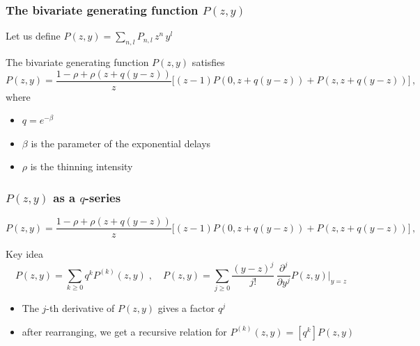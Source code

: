 \documentclass[table,aspectratio=169]{beamer}
\begin{document}
\begin{frame}[t]\frametitle{The bivariate generating function $P(z,y)$}
    Let us define $P(z,y) = \sum_{n,l} P_{n,l}\, z^n\,y^l$
    \begin{theorem}[Lancia et al, 2017]
        The bivariate generating function $P(z,y)$ satisfies
        \begin{equation*}
            P(z,y)= \frac{1 - \rho + \rho(z+q(y-z))}{z}\Big[ (z-1)P(0,z+q(y-z))
            + P(z, z+q(y-z))\Big]\,,
        \end{equation*}
        where
        \begin{itemize}
            \item $q=e^{-\beta}$
            \item $\beta$ is the parameter of the exponential delays
            \item $\rho$ is the thinning intensity
        \end{itemize}
    \end{theorem}
\end{frame}

\begin{frame}[t]\frametitle{$P(z,y)$ as a $q$-series}
    \begin{equation*}
        P(z,y)= \frac{1 - \rho + \rho(z+q(y-z))}{z}\Big[ (z-1)P(0,z+q(y-z))
        + P(z, z+q(y-z))\Big]\,,
    \end{equation*}
    \begin{alertblock}{Key idea}
        \begin{equation*}
            P(z,y)= \sum_{k\geq0} q^k P^{(k)}(z,y)\;,\quad
            P(z,y)= \sum_{j\geq0} \frac{(y-z)^j}{j!} \, \frac{\partial^j}{\partial y^j} P(z,y)\Big\vert_{y=z}
        \end{equation*}
        \begin{itemize}
            \item The $j$-th derivative of $P(z,y)$ gives a factor
            $q^j$
            \item after rearranging, we get a recursive relation for
           $P^{(k)}(z,y) = [q^k]P(z,y)$
        \end{itemize}
    \end{alertblock}
\end{frame}
\end{document}
